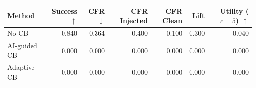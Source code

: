 \begin{tabular}{lrrrrrr}
\toprule
Method & Success $\uparrow$ & CFR $\downarrow$ & CFR Injected & CFR Clean & Lift & Utility ($c=5$) $\uparrow$ \\
\midrule
No CB & 0.840 & 0.364 & 0.400 & 0.100 & 0.300 & 0.040 \\
AI-guided CB & 0.000 & 0.000 & 0.000 & 0.000 & 0.000 & 0.000 \\
Adaptive CB & 0.000 & 0.000 & 0.000 & 0.000 & 0.000 & 0.000 \\
\bottomrule
\end{tabular}
